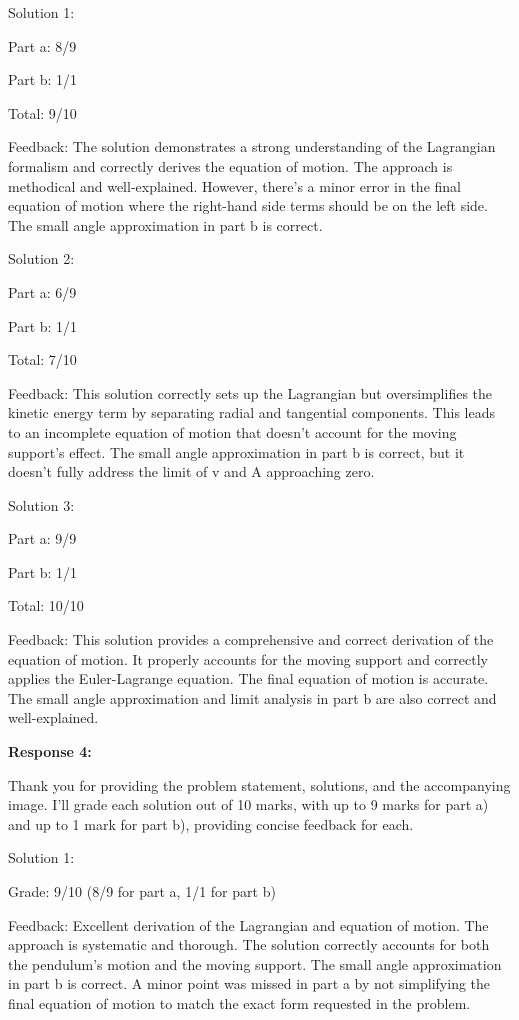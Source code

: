 \documentclass[a4paper,11pt]{article}
\begin{document}
Solution 1:

Part a: 8/9

Part b: 1/1

Total: 9/10

Feedback: The solution demonstrates a strong understanding of the Lagrangian formalism and correctly derives the equation of motion. The approach is methodical and well-explained. However, there's a minor error in the final equation of motion where the right-hand side terms should be on the left side. The small angle approximation in part b is correct.

Solution 2:

Part a: 6/9

Part b: 1/1

Total: 7/10

Feedback: This solution correctly sets up the Lagrangian but oversimplifies the kinetic energy term by separating radial and tangential components. This leads to an incomplete equation of motion that doesn't account for the moving support's effect. The small angle approximation in part b is correct, but it doesn't fully address the limit of v and A approaching zero.

Solution 3:

Part a: 9/9

Part b: 1/1

Total: 10/10

Feedback: This solution provides a comprehensive and correct derivation of the equation of motion. It properly accounts for the moving support and correctly applies the Euler-Lagrange equation. The final equation of motion is accurate. The small angle approximation and limit analysis in part b are also correct and well-explained.

\bigskip
\textbf{Response 4:}

Thank you for providing the problem statement, solutions, and the accompanying image. I'll grade each solution out of 10 marks, with up to 9 marks for part a) and up to 1 mark for part b), providing concise feedback for each.

Solution 1:

Grade: 9/10 (8/9 for part a, 1/1 for part b)

Feedback: Excellent derivation of the Lagrangian and equation of motion. The approach is systematic and thorough. The solution correctly accounts for both the pendulum's motion and the moving support. The small angle approximation in part b is correct. A minor point was missed in part a by not simplifying the final equation of motion to match the exact form requested in the problem.
\end{document}
